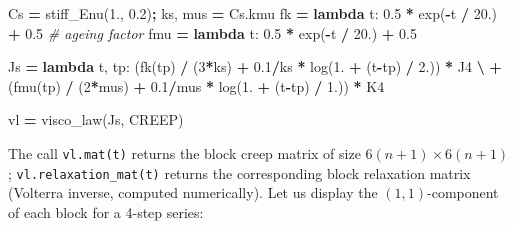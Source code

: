 \documentclass[
  a4paper,
  numbers=noendperiod,
  DIV=12]{scrreprt}
\newenvironment{Shaded}{\begin{snugshade}}{\end{snugshade}}
\newcommand{\CommentTok}[1]{\textcolor[rgb]{0.56,0.35,0.01}{\textit{#1}}}
\newcommand{\DecValTok}[1]{\textcolor[rgb]{0.00,0.00,0.81}{#1}}
\newcommand{\FloatTok}[1]{\textcolor[rgb]{0.00,0.00,0.81}{#1}}
\newcommand{\KeywordTok}[1]{\textcolor[rgb]{0.13,0.29,0.53}{\textbf{#1}}}
\newcommand{\NormalTok}[1]{#1}
\newcommand{\OperatorTok}[1]{\textcolor[rgb]{0.81,0.36,0.00}{\textbf{#1}}}
\begin{document}
\begin{Shaded}
\begin{Highlighting}[]
\NormalTok{Cs }\OperatorTok{=}\NormalTok{ stiff\_Enu(}\FloatTok{1.}\NormalTok{, }\FloatTok{0.2}\NormalTok{)}\OperatorTok{;}\NormalTok{  ks, mus }\OperatorTok{=}\NormalTok{ Cs.kmu}
\NormalTok{fk  }\OperatorTok{=} \KeywordTok{lambda}\NormalTok{ t: }\FloatTok{0.5} \OperatorTok{*}\NormalTok{ exp(}\OperatorTok{{-}}\NormalTok{t }\OperatorTok{/} \FloatTok{20.}\NormalTok{) }\OperatorTok{+} \FloatTok{0.5}   \CommentTok{\# ageing factor}
\NormalTok{fmu }\OperatorTok{=} \KeywordTok{lambda}\NormalTok{ t: }\FloatTok{0.5} \OperatorTok{*}\NormalTok{ exp(}\OperatorTok{{-}}\NormalTok{t }\OperatorTok{/} \FloatTok{20.}\NormalTok{) }\OperatorTok{+} \FloatTok{0.5}

\NormalTok{Js }\OperatorTok{=} \KeywordTok{lambda}\NormalTok{ t, tp: (fk(tp)  }\OperatorTok{/}\NormalTok{ (}\DecValTok{3}\OperatorTok{*}\NormalTok{ks)  }\OperatorTok{+} \FloatTok{0.1}\OperatorTok{/}\NormalTok{ks  }\OperatorTok{*}\NormalTok{ log(}\FloatTok{1.} \OperatorTok{+}\NormalTok{ (t}\OperatorTok{{-}}\NormalTok{tp) }\OperatorTok{/} \FloatTok{2.}\NormalTok{)) }\OperatorTok{*}\NormalTok{ J4 }\OperatorTok{\textbackslash{}}
                 \OperatorTok{+}\NormalTok{ (fmu(tp) }\OperatorTok{/}\NormalTok{ (}\DecValTok{2}\OperatorTok{*}\NormalTok{mus) }\OperatorTok{+} \FloatTok{0.1}\OperatorTok{/}\NormalTok{mus }\OperatorTok{*}\NormalTok{ log(}\FloatTok{1.} \OperatorTok{+}\NormalTok{ (t}\OperatorTok{{-}}\NormalTok{tp) }\OperatorTok{/} \FloatTok{1.}\NormalTok{)) }\OperatorTok{*}\NormalTok{ K4}

\NormalTok{vl }\OperatorTok{=}\NormalTok{ visco\_law(Js, CREEP)}
\end{Highlighting}
\end{Shaded}

The call \texttt{vl.mat(t)} returns the block creep matrix of size
\(6(n+1)\times 6(n+1)\); \texttt{vl.relaxation\_mat(t)} returns the
corresponding block relaxation matrix (Volterra inverse, computed
numerically). Let us display the \((1,1)\)-component of each block for a
4-step series:
\end{document}
